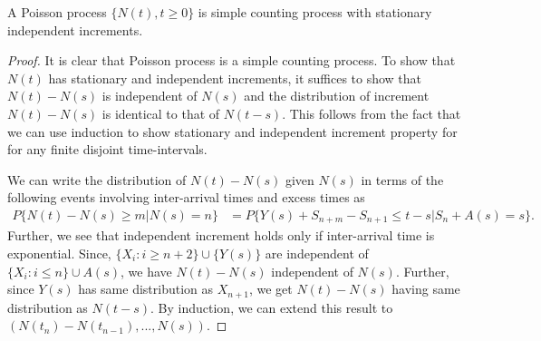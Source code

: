 \documentclass[a4paper,10pt,english]{article}
\begin{document}
\begin{prop} A Poisson process $\{N(t), t\geqslant 0\}$ is simple counting process with stationary independent increments.
\end{prop}
\begin{proof}
It is clear that Poisson process is a simple counting process. 
To show that $N(t)$ has stationary and independent increments, it suffices to show that $N(t)-N(s)$ is independent of $N(s)$ and the distribution of increment $N(t) - N(s)$ is identical to that of $N(t-s)$. 
This follows from the fact that we can use induction to show stationary and independent increment property for for any finite disjoint time-intervals. 

We can write the distribution of $N(t)-N(s)$ given $N(s)$ in terms of the following events involving inter-arrival times and excess times as 
\begin{align*}
P\{ N(t) - N(s) \geqslant m | N(s) = n \} &= P\{ Y(s) + S_{n+m} - S_{n+1} \leqslant t - s | S_n + A(s) = s \}.
\end{align*}
Further, we see that independent increment holds only if inter-arrival time is exponential. 
Since, $\{X_i: i \geqslant n+2\}\cup\{Y(s)\}$ are independent of $\{X_i: i \leqslant n\}\cup{A(s)}$, we have $N(t)-N(s)$ independent of $N(s)$. 
Further, since $Y(s)$ has same distribution as $X_{n+1}$, we get $N(t) - N(s)$ having same distribution as $N(t-s)$. 
By induction, we can extend this result to $(N(t_{n})-N(t_{n-1}),...,N(s))$. 
\end{proof}
\end{document}
